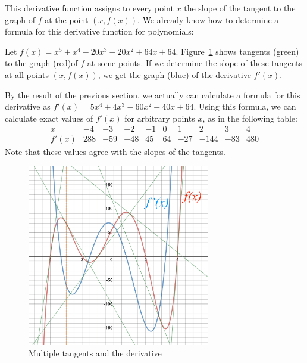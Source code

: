 This derivative function assigns to every point $x$ the slope of the tangent
to the graph of $f$ at the point $(x,f(x))$.
We already know how to determine a formula for this derivative function for
polynomials:
\begin{bsp}
Let $f(x)=x^{5}+x^{4}-20x^{3}-20x^{2}+64x+64$.
Figure~\ref{figmultitangent} shows tangents (green) to the graph (red)of $f$
at some points. If we determine the slope of these tangents at all points
$(x,f(x))$, we get the graph (blue) of the derivative $f'(x)$.

By the result of the previous section, we actually can calculate a formula
for this derivative as $f'(x)=5x^{4}+4x^{3}-60x^{2}-40x+64$. Using
this formula, we can calculate exact values of $f'(x)$ for arbitrary points $x$, as in the following table:
\[
\begin{array}{r|rrrrrrrrr}
x&-4&-3&-2&-1&0&1&2&3&4\\
\hline
f'(x)&288&-59&-48&45&64&-27&-144&-83&480
\end{array}
\]
Note that these values agree with the slopes of the tangents.
\end{bsp}
\begin{figure}[t]
\begin{center}
\includegraphics[width=8cm]{pic/MultiTangent.pdf}
\end{center}
\caption{Multiple tangents and the derivative}
\label{figmultitangent}
\end{figure}

